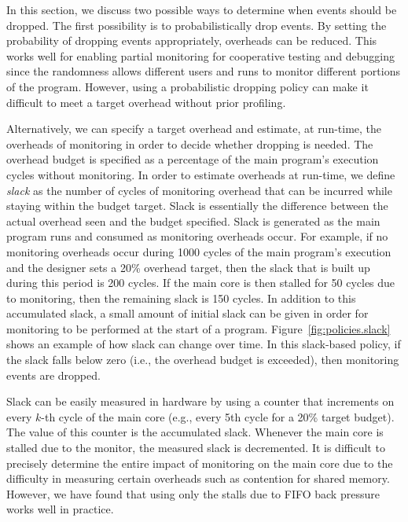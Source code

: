 In this section, we discuss two possible ways to determine when events should be dropped.
The first possibility is to probabilistically drop events. By setting the probability of
dropping events appropriately, overheads can be reduced. This works well for
enabling partial monitoring for cooperative testing and debugging since the
randomness allows different users and runs to monitor different portions of the
program. However, using a probabilistic dropping policy can make it difficult
to meet a target overhead without prior profiling.

Alternatively, we can specify a target overhead and estimate, at run-time, the
overheads of monitoring in order to decide whether dropping is needed.
The overhead budget is specified as a percentage of the main program's execution
cycles without monitoring. In order to estimate overheads at run-time, we define \emph{slack} as the number of cycles of
monitoring overhead that can be incurred while staying within the budget
target. Slack is essentially the difference between the actual overhead seen
and the budget specified. Slack is generated as the main program runs and consumed as monitoring overheads occur.  For
example, if no monitoring overheads occur during 1000 cycles of the main
program's execution and the designer sets a 20\% overhead target, then the
slack that is built up during this period is 200 cycles. If the main core is
then stalled for 50 cycles due to monitoring, then the remaining slack is 150
cycles. 
In addition to this accumulated slack, a small amount of initial slack
can be given in order for monitoring to be performed at the start of a program.
Figure~\ref{fig:policies.slack} shows an example of how slack can change over time.
In this slack-based policy, if the slack falls below zero (i.e., the overhead budget is exceeded), then
monitoring events are dropped.


Slack can be easily measured in hardware by using a counter that increments on every $k$-th
cycle of the main core (e.g., every 5th cycle for a 20\% target budget). 
The value of this counter is the
accumulated slack. Whenever the main core is stalled due to the monitor, the
measured slack is decremented. It is difficult to precisely determine the
entire impact of monitoring on the main core due to the
difficulty in measuring certain overheads such as contention for shared memory.
However, we have found that using only the stalls due to FIFO back pressure
works well in practice.

